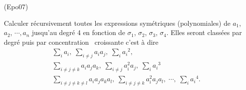 \begin{tiny}(Epo07)\end{tiny} Calculer récursivement toutes les expressions sym{\'e}triques (polynomiales) de 
$a_{1}$, $a_{2}$, $\cdots , a_{n}$  jusqu'au degr{\'e} 4 en fonction de $\sigma _{1}$, $\sigma _{2}$, $\sigma _{3}$, $\sigma _{4}$.\newline
Elles seront classées par degré puis par \og concentration\fg~  croissante c'est à dire
\begin{multline*}
  \sum_{i}a_i,\;
  \sum_{i \neq j}a_i a_j,\; \sum_{i}{a_i}^2, \\
  \sum_{i \neq j \neq k}a_i a_j a_k,\; \sum_{i\neq j}a_i^2 a_j,\; \sum_{i}{a_i}^3 \\
  \sum_{i \neq j \neq k \neq l}a_i a_j a_k a_l,\; \sum_{i\neq j \neq k}a_i^2 a_j a_l, \; \cdots,\;\sum_{i}{a_i}^4.
\end{multline*}
